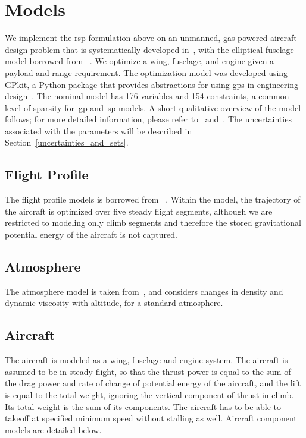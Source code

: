 \section{Models}

We implement the \gls{rsp} formulation above on an unmanned, gas-powered
aircraft design problem that is systematically developed in~\cite{Ozturk2018},
with the elliptical fuselage model borrowed from ~\cite{Burton2017}.
We optimize a wing, fuselage, and engine given a payload and range requirement.
The optimization model was developed using GPkit, a Python package that
provides abstractions for using \gls{gp}s in engineering design~\cite{gpkit}.
The nominal model has 176 variables and 154 constraints, a common level of
sparsity for~\gls{gp} and~\gls{sp} models.
A short qualitative overview of the model follows; for
more detailed information, please refer to~\cite{Ozturk2018} and~\cite{Burton2017}. The uncertainties
associated with the parameters will be described in Section~\ref{uncertainties_and_sets}.

\subsection{Flight Profile}

The flight profile models is borrowed from ~\cite{York2018}. Within the model, the
trajectory of the aircraft is optimized over five steady flight segments,
although we are restricted to modeling only climb segments
and therefore the stored gravitational potential energy of the aircraft is not captured.

\subsection{Atmosphere}

The atmosphere model is taken from~\cite{Tao2018}, and considers changes in density and dynamic
viscosity with altitude, for a standard atmosphere.

\subsection{Aircraft}

The aircraft is modeled as a wing, fuselage and engine system. The aircraft is assumed
to be in steady flight, so that the thrust power is equal to the sum of the drag power and rate of change
of potential energy of the aircraft, and the lift is equal to the total weight, ignoring the vertical component of
thrust in climb. Its total weight is the sum of its components.
The aircraft has to be able to takeoff at specified minimum speed without stalling as well.
Aircraft component models are detailed below.

